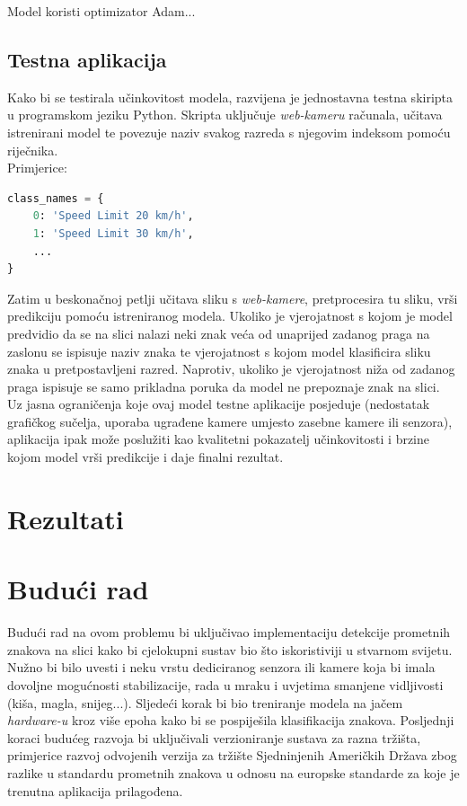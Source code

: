 \documentclass[times, utf8, zavrsni]{fer}
\begin{document}
Model koristi optimizator Adam...
\pagebreak
\section{Testna aplikacija}
Kako bi se testirala učinkovitost modela, razvijena je jednostavna testna skiripta u programskom jeziku Python. Skripta uključuje  \emph{web-kameru} računala, učitava istrenirani model te povezuje naziv svakog razreda s njegovim indeksom pomoću riječnika.
\\Primjerice:
\begin{lstlisting}[language=Python]
class_names = {
    0: 'Speed Limit 20 km/h',
    1: 'Speed Limit 30 km/h',
    ...
}
\end{lstlisting}

Zatim u beskonačnoj petlji učitava sliku s \emph{web-kamere}, pretprocesira tu sliku, vrši predikciju pomoću istreniranog modela. Ukoliko je vjerojatnost s kojom je model predvidio da se na slici nalazi neki znak veća od unaprijed zadanog praga na zaslonu se ispisuje naziv
znaka te vjerojatnost s kojom model klasificira sliku znaka u pretpostavljeni razred. Naprotiv, ukoliko je vjerojatnost niža od zadanog praga ispisuje se samo prikladna poruka da model ne prepoznaje znak na slici.
\\Uz jasna ograničenja koje ovaj model testne aplikacije posjeduje (nedostatak grafičkog sučelja, uporaba ugrađene kamere umjesto zasebne kamere ili senzora), aplikacija ipak može poslužiti kao kvalitetni pokazatelj učinkovitosti i brzine kojom model vrši predikcije i daje finalni rezultat. 

\chapter{Rezultati}

\chapter{Budući rad}
Budući rad na ovom problemu bi uključivao implementaciju detekcije prometnih znakova na slici kako bi cjelokupni sustav bio što iskoristiviji u stvarnom svijetu. Nužno bi bilo uvesti i neku vrstu dediciranog senzora ili kamere koja bi imala dovoljne mogućnosti stabilizacije, 
rada u mraku i uvjetima smanjene vidljivosti (kiša, magla, snijeg...). Sljedeći korak bi bio treniranje modela na jačem \emph{hardware-u} kroz više epoha kako bi se pospiješila klasifikacija znakova. Posljednji koraci budućeg razvoja bi uključivali verzioniranje sustava za razna tržišta, primjerice
razvoj odvojenih verzija za tržište Sjedninjenih Američkih Država zbog razlike u standardu prometnih znakova u odnosu na europske standarde za koje je trenutna aplikacija prilagođena.
\end{document}
